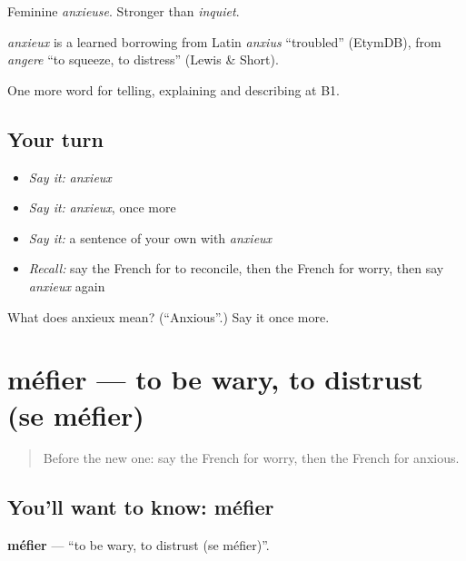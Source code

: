 Feminine \emph{anxieuse}. Stronger than \emph{inquiet}.

\begin{cousinweb}
\emph{anxieux} is a learned borrowing from Latin \emph{anxius} \textquotedblleft{}troubled\textquotedblright{} (EtymDB), from \emph{angere} \textquotedblleft{}to squeeze, to distress\textquotedblright{} (Lewis \& Short).
\end{cousinweb}

\begin{grammarlens}[title={What you've built}]
One more word for telling, explaining and describing at B1.
\end{grammarlens}

\subsection*{Your turn}
\begin{itemize}
\raggedright
  \item \emph{Say it:} \emph{anxieux}
  \item \emph{Say it:} \emph{anxieux}, once more
  \item \emph{Say it:} a sentence of your own with \emph{anxieux}
  \item \emph{Recall:} say the French for to reconcile, then the French for worry, then say \emph{anxieux} again
\end{itemize}

\begin{tcolorbox}[breakable,colback=teal!4,colframe=teal!35!black,title={Before you move on}]
What does anxieux mean? (\textquotedblleft{}Anxious\textquotedblright{}.) Say it once more.
\end{tcolorbox}
\section[méfier]{méfier — to be wary, to distrust (se méfier)}

\label{lesson:FR-C476-mefier}



\begin{quote}
Before the new one: say the French for worry, then the French for anxious.
\end{quote}

\subsection*{You'll want to know: méfier}
\textbf{méfier} — \textquotedblleft{}to be wary, to distrust (se méfier)\textquotedblright{}.

